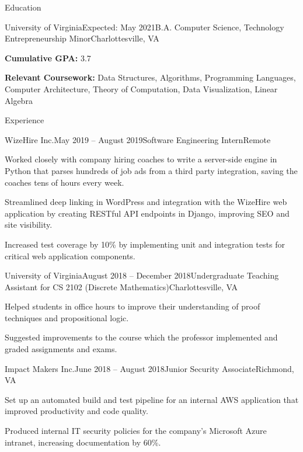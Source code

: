 \documentclass{resume}
\begin{document}
\vspace{-1em}
\begin{rSection}{Education}

  \begin{rSubsection}{University of Virginia}{Expected: May 2021}{B.A. Computer Science, Technology Entrepreneurship Minor}{Charlottesville, VA}
    \item \textbf{Cumulative GPA:} 3.7
    \item \textbf{Relevant Coursework:} Data Structures, Algorithms, Programming Languages, Computer Architecture, Theory of Computation, Data Visualization, Linear Algebra
  \end{rSubsection}

\end{rSection}

\begin{rSection}{Experience}

  \begin{rSubsection}{WizeHire Inc.}{May 2019 -- August 2019}{Software Engineering Intern}{Remote}
    \item Worked closely with company hiring coaches to write a server-side engine in Python that parses hundreds of job ads from a third party integration, saving the coaches tens of hours every week.
    \item Streamlined deep linking in WordPress and integration with the WizeHire web application by creating RESTful API endpoints in Django, improving SEO and site visibility.
    \item Increased test coverage by 10\% by implementing unit and integration tests for critical web application components.
  \end{rSubsection}

  \begin{rSubsection}{University of Virginia}{August 2018 -- December 2018}{Undergraduate Teaching Assistant for CS 2102 (Discrete Mathematics)}{Charlottesville, VA}
    \item Helped students in office hours to improve their understanding of proof techniques and propositional logic.
    \item Suggested improvements to the course which the professor implemented and graded assignments and exams.
  \end{rSubsection}

  \begin{rSubsection}{Impact Makers Inc.}{June 2018 -- August 2018}{Junior Security Associate}{Richmond, VA}
    \item Set up an automated build and test pipeline for an internal AWS application that improved productivity and code quality.
    \item Produced internal IT security policies for the company's Microsoft Azure intranet, increasing documentation by 60\%.
  \end{rSubsection}


\end{rSection}
\end{document}
